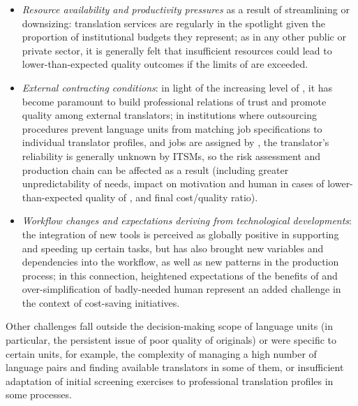 \documentclass[output=paper]{langsci/langscibook}
\begin{document}
\begin{itemize}
\item 
\textit{Resource availability and productivity pressures} as a result of streamlining or downsizing: translation services are regularly in the spotlight given the proportion of institutional budgets they represent; as in any other public or private sector, it is generally felt that insufficient resources could lead to lower-than-expected quality outcomes if the limits of  are exceeded. 
\end{itemize}
\begin{itemize}
\item 
\textit{External contracting conditions}: in light of the increasing level of , it has become paramount to build professional relations of trust and promote quality among external translators; in institutions where outsourcing procedures prevent language units from matching job specifications to individual translator profiles, and jobs are assigned by , the translator’s reliability is generally unknown by ITSMs, so the risk assessment and production chain can be affected as a result (including greater unpredictability of  needs, impact on motivation and human  in cases of lower-than-expected quality of , and final cost/quality ratio). 
\end{itemize}
\begin{itemize}
\item 
\textit{Workflow changes and expectations deriving from technological developments}: the integration of new tools is perceived as globally positive in supporting and speeding up certain tasks, but has also brought new variables and dependencies into the workflow, as well as new  patterns in the production process; in this connection, heightened expectations of the benefits of  and over-simplification of badly-needed human  represent an added challenge in the context of cost-saving initiatives. 
\end{itemize}

Other challenges fall outside the decision-making scope of language units (in particular, the persistent issue of poor quality of originals) or were specific to certain units, for example, the complexity of managing a high number of language pairs and finding available translators in some of them, or insufficient adaptation of initial screening exercises to professional translation profiles in some  processes. 
\end{document}
